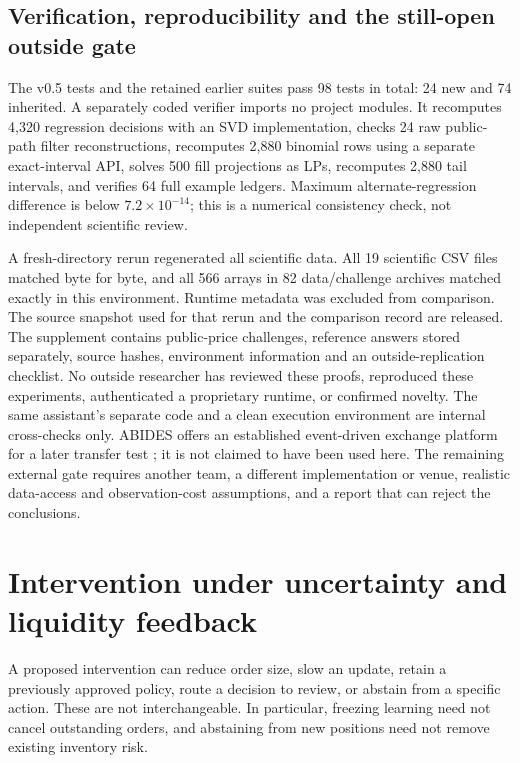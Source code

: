 \documentclass[11pt,a4paper]{article}
\theoremstyle{definition}
\theoremstyle{remark}
\begin{document}
\subsection{Verification, reproducibility and the still-open outside gate}
The v0.5 tests and the retained earlier suites pass 98 tests in total: 24 new and 74 inherited. A separately coded verifier imports no project modules. It recomputes 4,320 regression decisions with an SVD implementation, checks 24 raw public-path filter reconstructions, recomputes 2,880 binomial rows using a separate exact-interval API, solves 500 fill projections as LPs, recomputes 2,880 tail intervals, and verifies 64 full example ledgers. Maximum alternate-regression difference is below $7.2\times10^{-14}$; this is a numerical consistency check, not independent scientific review.

A fresh-directory rerun regenerated all scientific data. All 19 scientific CSV files matched byte for byte, and all 566 arrays in 82 data/challenge archives matched exactly in this environment. Runtime metadata was excluded from comparison. The source snapshot used for that rerun and the comparison record are released. The supplement contains public-price challenges, reference answers stored separately, source hashes, environment information and an outside-replication checklist. No outside researcher has reviewed these proofs, reproduced these experiments, authenticated a proprietary runtime, or confirmed novelty. The same assistant's separate code and a clean execution environment are internal cross-checks only. ABIDES offers an established event-driven exchange platform for a later transfer test \citep{byrd2019}; it is not claimed to have been used here. The remaining external gate requires another team, a different implementation or venue, realistic data-access and observation-cost assumptions, and a report that can reject the conclusions.

\section{Intervention under uncertainty and liquidity feedback}
\label{sec:intervention}
A proposed intervention can reduce order size, slow an update, retain a previously approved policy, route a decision to review, or abstain from a specific action. These are not interchangeable. In particular, freezing learning need not cancel outstanding orders, and abstaining from new positions need not remove existing inventory risk.
\end{document}
